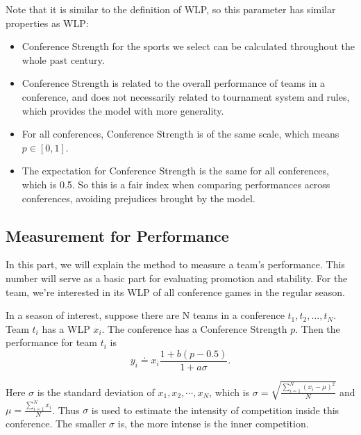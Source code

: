 
Note that it is similar to the definition of WLP, so this parameter has similar properties as WLP:
\begin{itemize}
\item Conference Strength for the sports we select can be calculated throughout the whole past century.
\item Conference Strength is related to the overall performance of teams in a conference, and does not necessarily related to tournament system and rules, which provides the model with more generality.
\item For all conferences, Conference Strength is of the same scale, which means $p\in [0,1]$.
\item The expectation for Conference Strength is the same for all conferences, which is 0.5. So this is a fair index when comparing performances across conferences, avoiding prejudices brought by the model.
\end{itemize}


\subsection{Measurement for Performance}
In this part, we will explain the method to measure a team's performance. This number will serve as a basic part for evaluating promotion and stability. For the team, we're interested in its WLP of all conference games in the regular season.

\newcommand{\performance}{x_i\frac{1+b(p-0.5)}{1+a\sigma}}
\begin{definition}
In a season of interest, suppose there are N teams in a conference $t_1, t_2,\dots,t_N$. Team $t_i$ has a WLP $x_i$. The conference has a Conference Strength $p$. Then the performance for team $t_i$ is
$$y_i\doteq \performance.$$
\end{definition}

Here $\sigma$ is the standard deviation of $x_1, x_2, \cdots, x_N$, which is $\sigma = \sqrt{ \frac{\sum_{i=1}^{N}(x_i - \mu)^2}{N}}$ and $\mu = \frac{\sum_{i=1}^N{x_i}}{N}$. Thus $\sigma$ is used to estimate the intensity of competition inside this conference. The smaller $\sigma$ is, the more intense is the inner competition.

